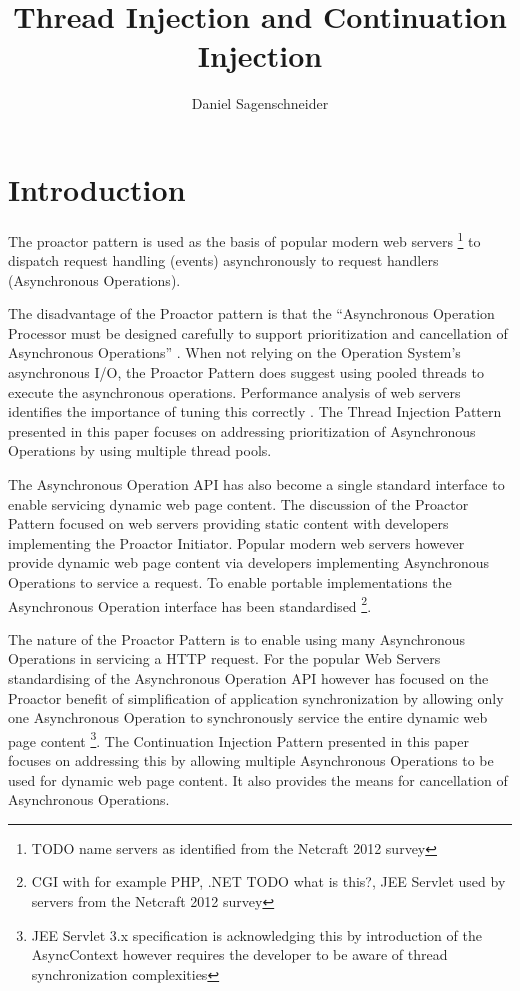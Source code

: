 \documentclass{article}
\begin{document}
\title{Thread Injection and Continuation Injection}
\author{Daniel Sagenschneider}
\date{}
\maketitle

\abstract{}


\section{Introduction}

The proactor pattern \cite{proactor} is used as the basis of popular modern web
servers \footnote{TODO name servers as identified from the Netcraft 2012 survey}
to dispatch request handling (events) asynchronously to request handlers
(Asynchronous Operations).

The disadvantage of the Proactor pattern is that the ``Asynchronous Operation
Processor must be designed carefully to support prioritization and cancellation
of Asynchronous Operations'' \cite{proactor}.  When not relying on the Operation
System's asynchronous I/O, the Proactor Pattern does suggest using pooled
threads to execute the asynchronous operations.  Performance analysis of web
servers identifies the importance of tuning this correctly
\cite{tuning-important,tuning-os-important,low-server-footprint}.  The Thread
Injection Pattern presented in this paper focuses on addressing prioritization
of Asynchronous Operations by using multiple thread pools.

The Asynchronous Operation API has also become a single standard interface to
enable servicing dynamic web page content.  The discussion of the Proactor
Pattern focused on web servers providing static content with developers
implementing the Proactor Initiator.  Popular modern web servers however provide
dynamic web page content via developers implementing Asynchronous Operations to
service a request.  To enable portable implementations the Asynchronous
Operation interface has been standardised \footnote{CGI with for example PHP,
.NET TODO what is this?, JEE Servlet used by servers from the Netcraft 2012
survey}.

The nature of the Proactor Pattern is to enable using many Asynchronous
Operations in servicing a HTTP request.  For the popular Web Servers
standardising of the Asynchronous Operation API however has focused on the
Proactor benefit of simplification of application synchronization by allowing
only one Asynchronous Operation to synchronously service the entire dynamic web
page content \footnote{JEE Servlet 3.x specification is acknowledging this by
introduction of the AsyncContext however requires the developer to be aware of
thread synchronization complexities}.  The Continuation Injection Pattern
presented in this paper focuses on addressing this by allowing multiple
Asynchronous Operations to be used for dynamic web page content. It also
provides the means for cancellation of Asynchronous Operations.
\end{document}

